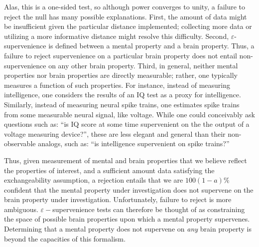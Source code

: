 \documentclass{article}
\newcommand{\eps}{\varepsilon}
\begin{document}
Alas, this is a one-sided test, so although power converges to unity, %
a failure to reject the null has many possible explanations.  First, the amount of data might be insufficient given the particular distance implemented; collecting more data or utilizing a more informative distance might resolve this difficulty.  Second, $\eps$-supervenience is defined between a mental property and a brain property.  Thus, a failure to reject supervenience on a particular brain property does not entail non-supervenience on any other brain property.  Third, in general, neither mental properties nor brain properties are directly measurable; rather, one typically measures a function of such properties.  For instance, instead of measuring intelligence, one considers the results of an IQ test as a proxy for intelligence.  Similarly, instead of measuring neural spike trains, one estimates spike trains from some measurable neural signal, like voltage.  While one could conceivably ask questions such as: ``is IQ score at some time supervenient on the the output of a voltage measuring device?'', these are less elegant and general than their non-observable analogs, such as: ``is intelligence supervenient on spike trains?''

Thus, given measurement of mental and brain properties that we believe reflect the properties of interest, and a sufficient amount data satisfying the exchangeability assumption, a rejection entails that we are $100(1-a)\%$ confident that the mental property under investigation does not supervene on the brain property under investigation.  Unfortunately, failure to reject is more ambiguous. $\eps-$supervenience tests can therefore be thought of as constraining the space of possible brain properties upon which a mental property supervenes.  Determining that a mental property does not supervene on \emph{any} brain property is beyond the capacities of this formalism.
\end{document}
